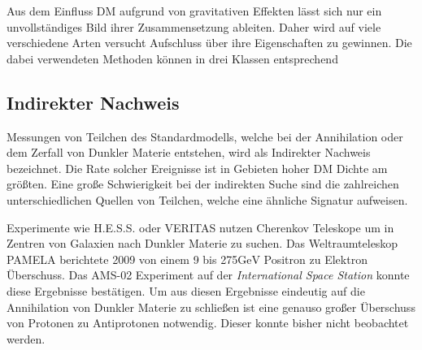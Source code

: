 Aus dem Einfluss DM aufgrund von gravitativen Effekten lässt sich nur ein unvollständiges Bild ihrer Zusammensetzung ableiten.
Daher wird auf viele verschiedene Arten versucht Aufschluss über ihre Eigenschaften zu gewinnen.
Die dabei verwendeten Methoden können in drei Klassen entsprechend 

\subsection*{Indirekter Nachweis}

Messungen von Teilchen des Standardmodells, welche bei der Annihilation oder dem Zerfall von Dunkler Materie entstehen, wird als Indirekter Nachweis bezeichnet. 
Die Rate solcher Ereignisse ist in Gebieten hoher DM Dichte am größten.
Eine große Schwierigkeit bei der indirekten Suche sind die zahlreichen unterschiedlichen Quellen von Teilchen, welche eine ähnliche Signatur aufweisen.

Experimente wie H.E.S.S. oder VERITAS nutzen Cherenkov Teleskope um in Zentren von Galaxien nach Dunkler Materie zu suchen.
Das Weltraumteleskop PAMELA berichtete 2009 von einem 9 bis 275$\si{\giga\electronvolt}$ Positron zu Elektron Überschuss.
Das AMS-02 Experiment auf der \textit{International Space Station} konnte diese Ergebnisse bestätigen.
Um aus diesen Ergebnisse eindeutig auf die Annihilation von Dunkler Materie zu schließen ist eine genauso großer Überschuss von Protonen zu Antiprotonen notwendig.
Dieser konnte bisher nicht beobachtet werden.\cite{PAMELA}